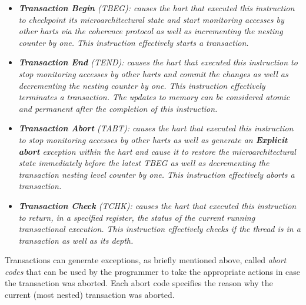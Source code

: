 \documentclass{article}
\begin{document}
            \begin{itemize}

                \item \textit{\textbf{Transaction Begin} (TBEG): causes the hart that executed this instruction to checkpoint its microarchitectural state and start monitoring accesses by other harts via the coherence protocol as well as incrementing the nesting counter by one. This instruction effectively starts a transaction.}

                \item \textit{\textbf{Transaction End} (TEND): causes the hart that executed this instruction to stop monitoring accesses by other harts and commit the changes as well as decrementing the nesting counter by one. This instruction effectively terminates a transaction. The updates to memory can be considered atomic and permanent after the completion of this instruction.}

                \item \textit{\textbf{Transaction Abort} (TABT): causes the hart that executed this instruction to stop monitoring accesses by other harts as well as generate an \textbf{Explicit abort} exception within the hart and cause it to restore the microarchitectural state immediately before the latest TBEG as well as decrementing the transaction nesting level counter by one. This instruction effectively aborts a transaction.}

                \item \textit{\textbf{Transaction Check} (TCHK): causes the hart that executed this instruction to return, in a specified register, the status of the current running transactional execution. This instruction effectively checks if the thread is in a transaction as well as its depth.}

            \end{itemize}

            Transactions can generate exceptions, as briefly mentioned above, called \textit{abort codes} that can be used by the programmer to take the appropriate actions in case the transaction was aborted. Each abort code specifies the reason why the current (most nested) transaction was aborted.
\end{document}
